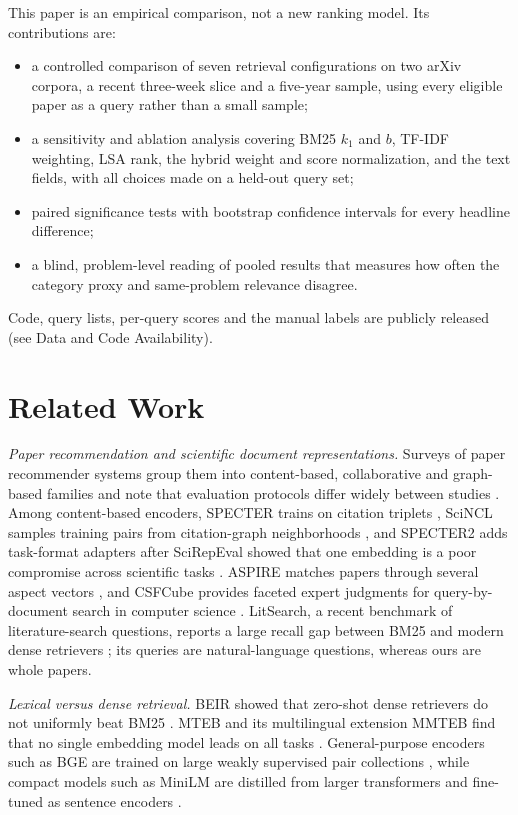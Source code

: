 \documentclass[conference]{IEEEtran}
\begin{document}
This paper is an empirical comparison, not a new ranking model. Its contributions are:
\begin{itemize}
\item a controlled comparison of seven retrieval configurations on two arXiv corpora, a recent three-week slice and a five-year sample, using every eligible paper as a query rather than a small sample;
\item a sensitivity and ablation analysis covering BM25 $k_1$ and $b$, TF-IDF weighting, LSA rank, the hybrid weight and score normalization, and the text fields, with all choices made on a held-out query set;
\item paired significance tests with bootstrap confidence intervals for every headline difference;
\item a blind, problem-level reading of pooled results that measures how often the category proxy and same-problem relevance disagree.
\end{itemize}
Code, query lists, per-query scores and the manual labels are publicly released (see Data and Code Availability).

\section{Related Work}

\textit{Paper recommendation and scientific document representations.} Surveys of paper recommender systems group them into content-based, collaborative and graph-based families and note that evaluation protocols differ widely between studies \cite{kreutz2022survey,pinedo2025survey}. Among content-based encoders, SPECTER trains on citation triplets \cite{cohan2020specter}, SciNCL samples training pairs from citation-graph neighborhoods \cite{ostendorff2022scincl}, and SPECTER2 adds task-format adapters after SciRepEval showed that one embedding is a poor compromise across scientific tasks \cite{singh2023scirepeval}. ASPIRE matches papers through several aspect vectors \cite{mysore2022aspire}, and CSFCube provides faceted expert judgments for query-by-document search in computer science \cite{mysore2021csfcube}. LitSearch, a recent benchmark of literature-search questions, reports a large recall gap between BM25 and modern dense retrievers \cite{ajith2024litsearch}; its queries are natural-language questions, whereas ours are whole papers.

\textit{Lexical versus dense retrieval.} BEIR showed that zero-shot dense retrievers do not uniformly beat BM25 \cite{thakur2021beir}. MTEB and its multilingual extension MMTEB find that no single embedding model leads on all tasks \cite{muennighoff2023mteb,enevoldsen2025mmteb}. General-purpose encoders such as BGE are trained on large weakly supervised pair collections \cite{xiao2024cpack}, while compact models such as MiniLM are distilled from larger transformers \cite{wang2020minilm} and fine-tuned as sentence encoders \cite{reimers2019sbert}.
\end{document}
